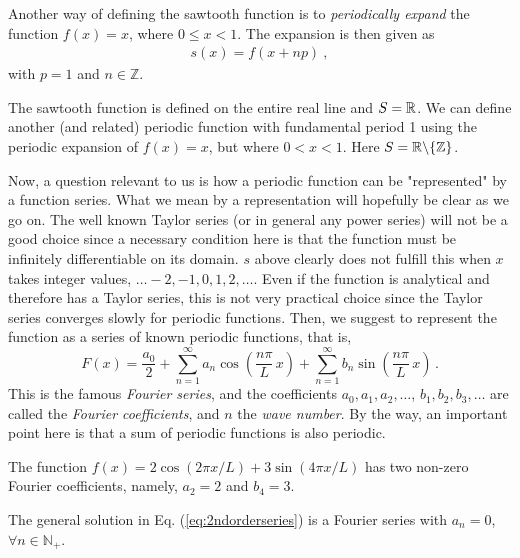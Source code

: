 Another way of defining the sawtooth function is to \emph{periodically expand} the 
function $f(x) = x$, where $0 \leq x < 1$. The expansion is then given as 
\begin{eqnarray}
	s(x) = f(x + np) \ , 
\end{eqnarray}
with $p=1$ and $n \in \mathbb{Z}$.

The sawtooth function is defined on the entire real line and $S=\mathbb{R}$. We can define another (and related) 
periodic function with fundamental period 1 using the periodic expansion of $f(x)=x$, 
but where $0 < x < 1$. Here $S=\mathbb{R} \backslash \{\mathbb{Z}\}$. 

Now, a question relevant to us is how a periodic function can be "represented" by a function 
series. What we mean by a representation will hopefully be clear as we go on. 
The well known Taylor series (or in general any power series) will not be a good choice 
since a necessary condition here is that the function must be  
infinitely differentiable on its domain. $s$ above clearly does not fulfill 
this when $x$ takes integer values, $\ldots -2,-1,0,1,2, \ldots$. 
Even if the function is analytical and therefore has a Taylor series, 
this is not very practical choice since the Taylor 
series converges slowly for periodic functions. Then, we suggest to represent the function as 
a series of known periodic functions, that is, 
\begin{equation}
	\label{eq:Fouriereq}
	F(x) = \frac{a_0}{2} + \sum_{n=1}^\infty a_n \cos\left(\frac{n\pi }{L} \, x\right) 
	+ \sum_{n=1}^\infty b_n \sin\left(\frac{n\pi }{L} \, x\right) \, .
\end{equation} 
This is the famous \emph{Fourier series}, and the 
coefficients $a_0, a_1, a_2, \ldots$, $b_1, b_2, b_3, \ldots$ are called the 
\emph{Fourier coefficients}, and $n$ the \emph{wave number}. 
By the way, an important point here is that a sum of periodic functions is also periodic. 

\begin{example}
	The function $f(x) = 2\cos(2\pi x/L) + 3\sin(4\pi x/L)$ has two non-zero 
	Fourier coefficients, namely, $a_2=2$ and $b_4=3$. 
\end{example}

\begin{example}
	The general solution in Eq. (\ref{eq:2ndorderseries}) is a Fourier series with $a_n = 0$,
	$\forall n \in \mathbb{N}_+$.
\end{example}

